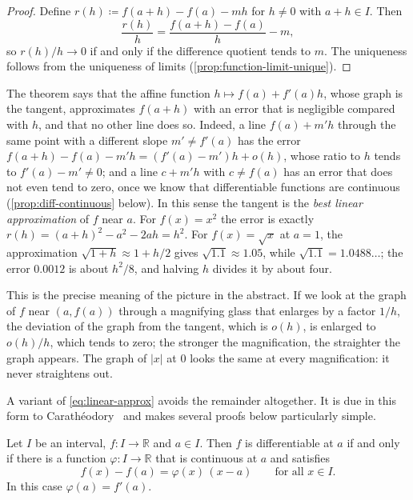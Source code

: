\begin{proof}
Define $r(h)\coloneqq f(a+h)-f(a)-mh$ for $h\ne0$ with $a+h\in I$. Then
\[
\frac{r(h)}h=\frac{f(a+h)-f(a)}h-m ,
\]
so $r(h)/h\to0$ if and only if the difference quotient tends to $m$. The uniqueness follows from the uniqueness of limits (\cref{prop:function-limit-unique}).
\end{proof}

The theorem says that the affine function $h\mapsto f(a)+f'(a)h$, whose graph is the tangent, approximates $f(a+h)$ with an error that is negligible compared with $h$, and that no other line does so. Indeed, a line $f(a)+m'h$ through the same point with a different slope $m'\ne f'(a)$ has the error $f(a+h)-f(a)-m'h=(f'(a)-m')h+o(h)$, whose ratio to $h$ tends to $f'(a)-m'\ne0$; and a line $c+m'h$ with $c\ne f(a)$ has an error that does not even tend to zero, once we know that differentiable functions are continuous (\cref{prop:diff-continuous} below). In this sense the tangent is the \emph{best linear approximation} of $f$ near $a$. For $f(x)=x^2$ the error is exactly $r(h)=(a+h)^2-a^2-2ah=h^2$. For $f(x)=\sqrt x$ at $a=1$, the approximation $\sqrt{1+h}\approx1+h/2$ gives $\sqrt{1.1}\approx1.05$, while $\sqrt{1.1}=1.0488\ldots$; the error $0.0012$ is about $h^2/8$, and halving $h$ divides it by about four.

This is the precise meaning of the picture in the abstract. If we look at the graph of $f$ near $(a,f(a))$ through a magnifying glass that enlarges by a factor $1/h$, the deviation of the graph from the tangent, which is $o(h)$, is enlarged to $o(h)/h$, which tends to zero; the stronger the magnification, the straighter the graph appears. The graph of $|x|$ at $0$ looks the same at every magnification: it never straightens out.

A variant of \eqref{eq:linear-approx} avoids the remainder altogether. It is due in this form to Carath\'eodory~\cite{bartle2011} and makes several proofs below particularly simple.

\begin{lemma}
\label{lem:caratheodory}
Let $I$ be an interval, $f\colon I\to\mathbb R$ and $a\in I$. Then $f$ is differentiable at $a$ if and only if there is a function $\varphi\colon I\to\mathbb R$ that is continuous at $a$ and satisfies
\begin{equation}
f(x)-f(a)=\varphi(x)\,(x-a)\qquad\text{for all }x\in I .
\label{eq:caratheodory}
\end{equation}
In this case $\varphi(a)=f'(a)$.
\end{lemma}

